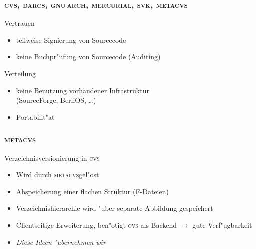 \documentclass[german]{beamer}
\newcommand{\METACVS}{\textsc{metacvs}}
\newcommand{\CVS}{\textsc{cvs}}
\newcommand{\DARCS}{\textsc{darcs}}
\newcommand{\GNUARCH}{\textsc{gnu\,arch}}
\newcommand{\MERCURIAL}{\textsc{mercurial}}
\newcommand{\SVK}{\textsc{svk}}
\begin{document}
\begin{frame}
  \frametitle{\CVS, \DARCS, \GNUARCH, \MERCURIAL, \SVK, \METACVS}
  \begin{block}{Vertrauen}
    \begin{itemize}
    \item teilweise Signierung von Sourcecode
    \item \alert{keine} Buchpr"ufung von Sourcecode (Auditing)
    \end{itemize}
  \end{block}

  \begin{block}{Verteilung}
    \begin{itemize}
    \item \alert{keine} Benutzung vorhandener Infrastruktur\\
      (SourceForge, BerliOS, \ldots)
    \item Portabilit"at
    \end{itemize}
  \end{block}
  
\end{frame}


\begin{frame}
  \frametitle{\METACVS}
  \begin{block}{Verzeichnisversionierung in \CVS}
    \begin{itemize}
    \item Wird durch \METACVS gel"ost
    \item Abspeicherung einer flachen Struktur (F-Dateien)
    \item Verzeichnishierarchie wird "uber separate Abbildung
      gespeichert
    \item Clientseitige Erweiterung, ben"otigt \CVS{} als Backend
      $\to$ gute Verf"ugbarkeit
    \item \emph{Diese Ideen "ubernehmen wir}
    \end{itemize}
  \end{block}
\end{frame}
\end{document}
